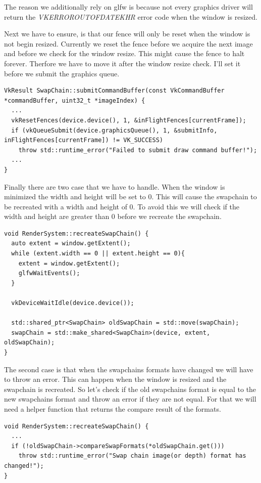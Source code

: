 \documentclass[12pt]{report} \usepackage{preamble}
\begin{document}
The reason we additionally rely on glfw is because not every graphics driver will return the \textit{VK\textunderscore ERROR\textunderscore OUT\textunderscore OF\textunderscore DATE\textunderscore KHR}
error code when the window is resized.

Next we have to ensure, is that our fence will only be reset when the window is not begin resized. Currently we reset the fence before we acquire the next image and before we check for the window resize.
This might cause the fence to halt forever. Therfore we have to move it after the window resize check. I'll set it before we submit the graphics queue.

\begin{lstlisting}[Language=C++]
VkResult SwapChain::submitCommandBuffer(const VkCommandBuffer *commandBuffer, uint32_t *imageIndex) {
  ...
  vkResetFences(device.device(), 1, &inFlightFences[currentFrame]);
  if (vkQueueSubmit(device.graphicsQueue(), 1, &submitInfo, inFlightFences[currentFrame]) != VK_SUCCESS)
    throw std::runtime_error("Failed to submit draw command buffer!");
  ...
}
\end{lstlisting}

Finally there are two case that we have to handle. When the window is minimized the width and height will be set to 0. This will cause the swapchain to be recreated with a width and height of 0.
To avoid this we will check if the width and height are greater than 0 before we recreate the swapchain.

\begin{lstlisting}[Language=C++]
void RenderSystem::recreateSwapChain() {
  auto extent = window.getExtent();
  while (extent.width == 0 || extent.height == 0){
    extent = window.getExtent();
    glfwWaitEvents();
  }

  vkDeviceWaitIdle(device.device());

  std::shared_ptr<SwapChain> oldSwapChain = std::move(swapChain);
  swapChain = std::make_shared<SwapChain>(device, extent, oldSwapChain);
}
\end{lstlisting}

The second case is that when the swapchains formats have changed we will have to throw an error. This can happen when the window is resized and the swapchain is recreated.
So let's check if the old swapchains format is equal to the new swapchains format and throw an error if they are not equal. For that we will need a helper function that returns the
compare result of the formats.

\begin{lstlisting}[Language=C++]
void RenderSystem::recreateSwapChain() {
  ...
  if (!oldSwapChain->compareSwapFormats(*oldSwapChain.get()))
    throw std::runtime_error("Swap chain image(or depth) format has changed!");
}
\end{lstlisting}
\end{document}
